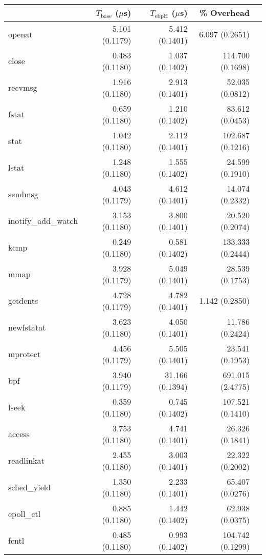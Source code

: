 \begin{tabular}{>{\ttfamily}lrrrr}
\toprule
\multicolumn{1}{l}{System Call} & $T_{\text{base}}$ ($\mu$s) & $T_{\text{ebpH}}$ ($\mu$s) &       \% Overhead \\
\midrule
                         openat &             5.101 (0.1179) &             5.412 (0.1401) &    6.097 (0.2651) \\
                          close &             0.483 (0.1180) &             1.037 (0.1402) &  114.700 (0.1698) \\
                        recvmsg &             1.916 (0.1180) &             2.913 (0.1401) &   52.035 (0.0812) \\
                          fstat &             0.659 (0.1180) &             1.210 (0.1402) &   83.612 (0.0453) \\
                           stat &             1.042 (0.1180) &             2.112 (0.1401) &  102.687 (0.1216) \\
                          lstat &             1.248 (0.1180) &             1.555 (0.1402) &   24.599 (0.1910) \\
                        sendmsg &             4.043 (0.1179) &             4.612 (0.1401) &   14.074 (0.2332) \\
            inotify\_add\_watch &             3.153 (0.1180) &             3.800 (0.1401) &   20.520 (0.2074) \\
                           kcmp &             0.249 (0.1180) &             0.581 (0.1402) &  133.333 (0.2444) \\
                           mmap &             3.928 (0.1179) &             5.049 (0.1401) &   28.539 (0.1753) \\
                       getdents &             4.728 (0.1179) &             4.782 (0.1401) &    1.142 (0.2850) \\
                     newfstatat &             3.623 (0.1180) &             4.050 (0.1401) &   11.786 (0.2424) \\
                       mprotect &             4.456 (0.1179) &             5.505 (0.1401) &   23.541 (0.1953) \\
                            bpf &             3.940 (0.1179) &            31.166 (0.1394) &  691.015 (2.4775) \\
                          lseek &             0.359 (0.1180) &             0.745 (0.1402) &  107.521 (0.1410) \\
                         access &             3.753 (0.1180) &             4.741 (0.1401) &   26.326 (0.1841) \\
                     readlinkat &             2.455 (0.1180) &             3.003 (0.1401) &   22.322 (0.2002) \\
                   sched\_yield &             1.350 (0.1180) &             2.233 (0.1401) &   65.407 (0.0276) \\
                     epoll\_ctl &             0.885 (0.1180) &             1.442 (0.1402) &   62.938 (0.0375) \\
                          fcntl &             0.485 (0.1180) &             0.993 (0.1402) &  104.742 (0.1299) \\
\bottomrule
\end{tabular}
